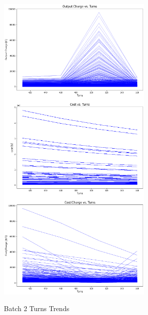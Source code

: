 \begin{figure}
    \begin{center}
    \includegraphics[width=3in]{fig23.png}
    \end{center}
    \renewcommand{\baselinestretch}{1}
    \small\normalsize
    \begin{quote}
    \caption[Batch 2 Turns Trends]{Batch 2 Turns Trends} \label{fig: f23}
    \end{quote}
\end{figure}

